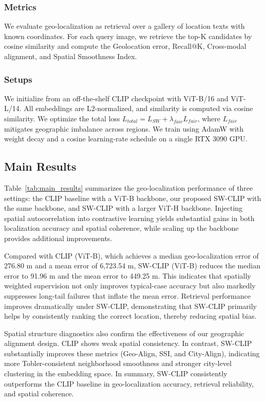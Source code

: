 \documentclass{isprs}
\begin{document}
\subsubsection{Metrics} We evaluate geo-localization as retrieval over a gallery of location texts with known coordinates. For each query image, we retrieve the top-K candidates by cosine similarity and compute the Geolocation error, Recall@K, Cross-modal alignment, and Spatial Smoothness Index. 

\subsubsection{Setups} We initialize from an off-the-shelf CLIP checkpoint with ViT-B/16 and ViT-L/14. All embeddings are L2-normalized, and similarity is computed via cosine similarity. We optimize the total loss $L_{total} = L_{SW} + \lambda_{fair}L_{fair}$, where $L_{fair}$ mitigates geographic imbalance across regions. We train using AdamW with weight decay and a cosine learning-rate schedule on a single RTX 3090 GPU. 

\subsection{Main Results}

Table~\ref{tab:main_results} summarizes the geo-localization performance of three settings: the CLIP baseline with a ViT-B backbone, our proposed SW-CLIP with the same backbone, and SW-CLIP with a larger ViT-H backbone. Injecting spatial autocorrelation into contrastive learning yields substantial gains in both localization accuracy and spatial coherence, while scaling up the backbone provides additional improvements.

Compared with CLIP (ViT-B), which achieves a median geo-localization error of 276.80 m and a mean error of 6,723.54 m, SW-CLIP (ViT-B) reduces the median error to 91.96 m and the mean error to 449.25 m. This indicates that spatially weighted supervision not only improves typical-case accuracy but also markedly suppresses long-tail failures that inflate the mean error. Retrieval performance improves dramatically under SW-CLIP, demonstrating that SW-CLIP primarily helps by consistently ranking the correct location, thereby reducing spatial bias.

Spatial structure diagnostics also confirm the effectiveness of our geographic alignment design. CLIP shows weak spatial consistency. In contrast, SW-CLIP substantially improves these metrics (Geo-Align, SSI, and City-Align), indicating more Tobler-consistent neighborhood smoothness and stronger city-level clustering in the embedding space. In summary, SW-CLIP consistently outperforms the CLIP baseline in geo-localization accuracy, retrieval reliability, and spatial coherence.
\end{document}
